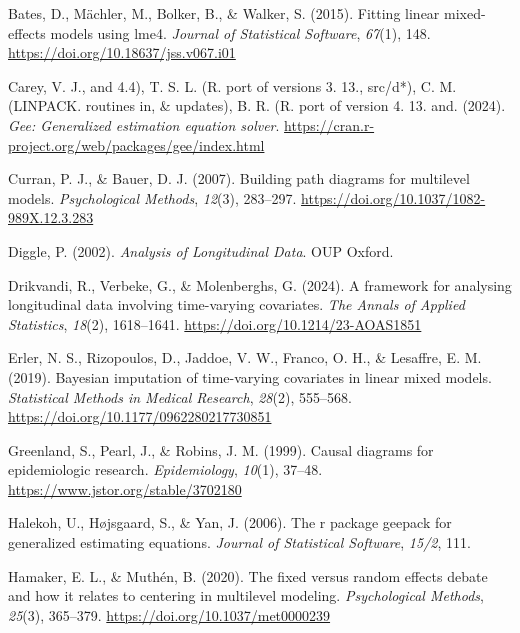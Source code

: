 \documentclass[
  12pt,
  a4paper,
]{article}
\newlength{\cslhangindent}
\newenvironment{CSLReferences}[2] %
 {\begin{list}{}{%
  \setlength{\itemindent}{0pt}
  \setlength{\leftmargin}{0pt}
  \setlength{\parsep}{0pt}
  \ifodd #1
   \setlength{\leftmargin}{\cslhangindent}
   \setlength{\itemindent}{-1\cslhangindent}
  \fi
  \setlength{\itemsep}{#2\baselineskip}}}
 {\end{list}}
\begin{document}
\label{refs}
\begin{CSLReferences}{1}{0}
Bates, D., Mächler, M., Bolker, B., \& Walker, S. (2015). Fitting linear
mixed-effects models using {lme4}. \emph{Journal of Statistical
Software}, \emph{67}(1), 148.
\url{https://doi.org/10.18637/jss.v067.i01}

Carey, V. J., and 4.4), T. S. L. (R. port of versions 3. 13., src/d*),
C. M. (LINPACK. routines in, \& updates), B. R. (R. port of version 4.
13. and. (2024). \emph{Gee: Generalized estimation equation solver}.
\url{https://cran.r-project.org/web/packages/gee/index.html}

Curran, P. J., \& Bauer, D. J. (2007). Building path diagrams for
multilevel models. \emph{Psychological Methods}, \emph{12}(3), 283--297.
\url{https://doi.org/10.1037/1082-989X.12.3.283}

Diggle, P. (2002). \emph{Analysis of Longitudinal Data}. OUP Oxford.

Drikvandi, R., Verbeke, G., \& Molenberghs, G. (2024). A framework for
analysing longitudinal data involving time-varying covariates. \emph{The
Annals of Applied Statistics}, \emph{18}(2), 1618--1641.
\url{https://doi.org/10.1214/23-AOAS1851}

Erler, N. S., Rizopoulos, D., Jaddoe, V. W., Franco, O. H., \& Lesaffre,
E. M. (2019). Bayesian imputation of time-varying covariates in linear
mixed models. \emph{Statistical Methods in Medical Research},
\emph{28}(2), 555--568. \url{https://doi.org/10.1177/0962280217730851}

Greenland, S., Pearl, J., \& Robins, J. M. (1999). Causal diagrams for
epidemiologic research. \emph{Epidemiology}, \emph{10}(1), 37--48.
\url{https://www.jstor.org/stable/3702180}

Halekoh, U., Højsgaard, S., \& Yan, J. (2006). The r package geepack for
generalized estimating equations. \emph{Journal of Statistical
Software}, \emph{15/2}, 111.

Hamaker, E. L., \& Muthén, B. (2020). The fixed versus random effects
debate and how it relates to centering in multilevel modeling.
\emph{Psychological Methods}, \emph{25}(3), 365--379.
\url{https://doi.org/10.1037/met0000239}


\end{CSLReferences}
\end{document}
